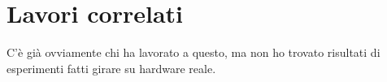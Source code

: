 \chapter{Lavori correlati}\label{ch:correlati}

C'è già ovviamente chi ha lavorato a questo, ma non ho trovato risultati 
di esperimenti fatti girare su hardware reale. 